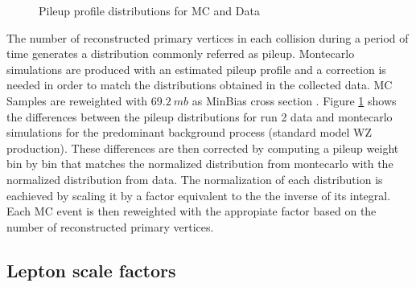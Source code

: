 \begin{figure}[tph]
  \centering
        \vfil
  \caption{Pileup profile distributions for MC and Data}
  \label{fig:RunII_PileupProfiles}
\end{figure}

The number of reconstructed primary vertices in each collision during a period
of time generates a distribution commonly referred as pileup. Montecarlo simulations
are produced with an estimated pileup profile and a correction is needed
in order to match the distributions obtained in the collected data.
MC Samples are reweighted with $69.2~mb$ as MinBias cross section \cite{pureweight}.
Figure \ref{fig:RunII_PileupProfiles} shows the differences between the
pileup distributions for run 2 data and montecarlo
simulations for the predominant background process (standard model
WZ production). These differences are then
corrected by computing a pileup weight bin by bin that matches the normalized
distribution from montecarlo with the normalized distribution from data.
The normalization of each distribution is eachieved by scaling it by a factor
equivalent to the the inverse of its integral. Each MC event is then reweighted
with the appropiate factor based on the number of reconstructed primary vertices. 

\subsection{Lepton scale factors}


